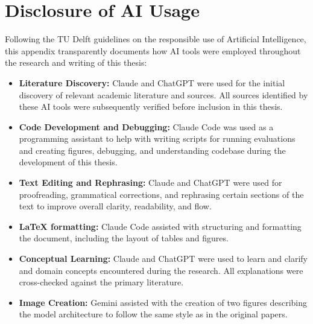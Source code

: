 \chapter{Disclosure of AI Usage}
\label{app:ai_usage}

Following the TU Delft guidelines on the responsible use of Artificial
Intelligence, this appendix transparently documents how AI tools were employed
throughout the research and writing of this thesis:

\begin{itemize}
  \item \textbf{Literature Discovery:} Claude and ChatGPT were used for the
  initial discovery of relevant academic literature and sources. All sources
  identified by these AI tools were subsequently verified before inclusion in
  this thesis.

  \item \textbf{Code Development and Debugging:} Claude Code was used as a
  programming assistant to help with writing scripts for
  running evaluations and creating figures, debugging, and understanding codebase
  during the development of this thesis.

  \item \textbf{Text Editing and Rephrasing:} Claude and ChatGPT were used for
  proofreading, grammatical corrections, and rephrasing certain sections of the
  text to improve overall clarity, readability, and flow.

  \item \textbf{LaTeX formatting:} Claude Code assisted with structuring and
  formatting the document, including the layout of tables and figures.

  \item \textbf{Conceptual Learning:} Claude and ChatGPT were used to learn and clarify and
  domain concepts encountered during the research. All
  explanations were cross-checked against the primary literature.

  \item \textbf{Image Creation:} Gemini assisted with the creation of two figures
  describing the model architecture to follow the same style as in the original papers.


\end{itemize}
